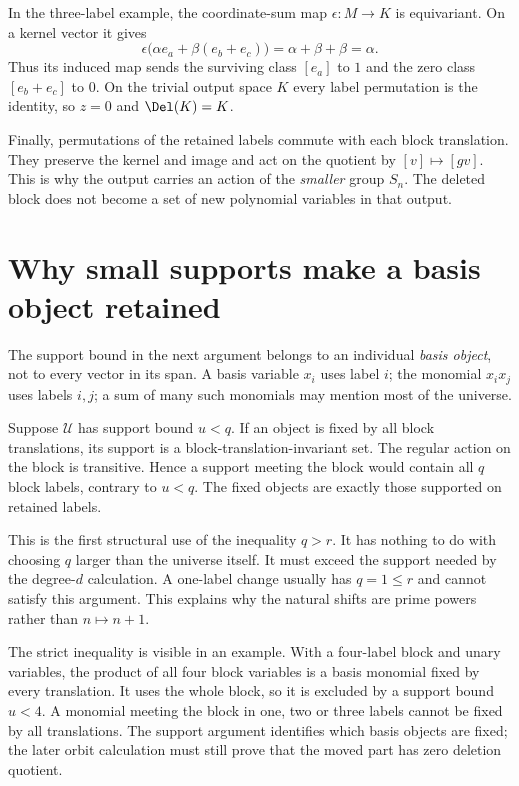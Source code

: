 \documentclass[11pt,a4paper,oneside,openany]{book}
\theoremstyle{definition}\newtheorem{definition}[theorem]{Definition}
\theoremstyle{remark}\newtheorem{remark}[theorem]{Remark}
\numberwithin{equation}{chapter}
\begin{document}
In the three-label example, the coordinate-sum map
$\epsilon:M\to K$ is equivariant. On a kernel vector it gives
\[
 \epsilon\bigl(\alpha e_a+\beta(e_b+e_c)\bigr)
                       =\alpha+\beta+\beta=\alpha.
\]
Thus its induced map sends the surviving class $[e_a]$ to $1$
and the zero class $[e_b+e_c]$ to $0$. On the trivial output
space $K$ every label permutation is the identity, so $z=0$ and
$\Del(K)=K$.

Finally, permutations of the retained labels commute with each
block translation. They preserve the kernel and image and act on
the quotient by $[v]\mapsto[g v]$. This is why the output carries
an action of the \emph{smaller} group $S_n$. The deleted block
does not become a set of new polynomial variables in that output.

\section{Why small supports make a basis object retained}
The support bound in the next argument belongs to an individual
\emph{basis object}, not to every vector in its span. A basis variable
$x_i$ uses label $i$; the monomial $x_i x_j$ uses labels $i,j$;
a sum of many such monomials may mention most of the universe.

Suppose $\mathcal U$ has support bound $u<q$. If an object is fixed by
all block translations, its support is a block-translation-invariant set.
The regular action on the block is transitive. Hence a support meeting
the block would contain all $q$ block labels, contrary to $u<q$.
The fixed objects are exactly those supported on retained labels.

This is the first structural use of the inequality $q>r$. It has nothing
to do with choosing $q$ larger than the universe itself. It must exceed
the support needed by the degree-$d$ calculation. A one-label change
usually has $q=1\le r$ and cannot satisfy this argument. This explains
why the natural shifts are prime powers rather than $n\mapsto n+1$.

The strict inequality is visible in an example. With a four-label
block and unary variables, the product of all four block variables
is a basis monomial fixed by every translation. It uses the whole
block, so it is excluded by a support bound $u<4$. A monomial
meeting the block in one, two or three labels cannot be fixed by
all translations.
The support argument identifies which basis objects are fixed;
the later orbit calculation must still prove that the moved part
has zero deletion quotient.
\end{document}
